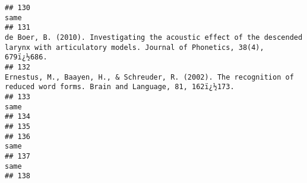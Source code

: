 \documentclass[
  english,
  man]{apa6}
\begin{document}
\begin{verbatim}
## 130                                                                                                                                                                                                                                                                                                                same
## 131                                                                                                                                                                     de Boer, B. (2010). Investigating the acoustic effect of the descended larynx with articulatory models. Journal of Phonetics, 38(4), 679ï¿½686.
## 132                                                                                                                                                                                         Ernestus, M., Baayen, H., & Schreuder, R. (2002). The recognition of reduced word forms. Brain and Language, 81, 162ï¿½173.
## 133                                                                                                                                                                                                                                                                                                                same
## 134                                                                                                                                                                                                                                                                                                                    
## 135                                                                                                                                                                                                                                                                                                                    
## 136                                                                                                                                                                                                                                                                                                                same
## 137                                                                                                                                                                                                                                                                                                                same
## 138                                                                                                                                                                                                                                                                                                                    

\end{verbatim}
\end{document}

